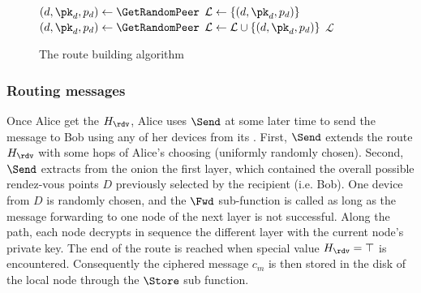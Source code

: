 \begin{figure}[t]

  \vspace{0.3em}

  \begin{algorithmic}[1]
    \Function{\CreateOnionLayer}{\null}
      \State $(d, \pk_d, p_d)\gets \GetRandomPeer$
      \State $\mathcal{L}\gets \{(d, \pk_d, p_d)\}$
        \State $(d, \pk_d, p_d)\gets \GetRandomPeer$
        \State $\mathcal{L}\gets \mathcal{L}\cup \{(d, \pk_d, p_d)\}$
      \EndWhile
      \State \Return $\mathcal{L}$
    \EndFunction
  \end{algorithmic}
  \caption{\label{fig:route building algo}The route building algorithm}
\end{figure}

\subsubsection{Routing messages}
\label{ssub:routing_messages}


Once Alice get the \(H_\rdv\), Alice uses \(\Send\) at some
later time to send the message to Bob using any of her devices from
its \squad.%
First, \(\Send\) extends the route
\(H_\rdv\) with some hops of Alice's choosing (uniformly randomly
chosen). Second, \(\Send\) extracts from the onion the first
layer, which contained the overall
possible rendez-vous points $D$ previously selected by the recipient (i.e. Bob).
One device from $D$ is randomly chosen, and the \(\Fwd\)
sub-function is called as long as the message forwarding to one node of
the next layer is not successful.%
Along the path, each node decrypts
in sequence the different layer with the current node’s private key. 
The end of the route is reached when special value \(H_\rdv = \top\) is
encountered. Consequently the ciphered message \(c_m\) is then stored
in the disk of the local node through the \(\Store\) sub function.%


